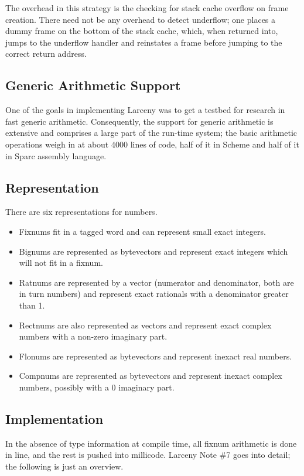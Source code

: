 The overhead in this strategy is the checking for stack cache overflow
on frame creation. There need not be any overhead to detect underflow;
one places a dummy frame on the bottom of the stack cache, which, when
returned into, jumps to the underflow handler and reinstates a frame
before jumping to the correct return address.

\subsection{Generic Arithmetic Support}

One of the goals in implementing Larceny was to get a testbed for research
in fast generic arithmetic. Consequently, the support for generic arithmetic
is extensive and comprises a large part of the run-time system; the basic
arithmetic operations weigh in at about 4000 lines of code, half of it in
Scheme and half of it in Sparc assembly language.

\subsection{Representation}

There are six representations for numbers.

\begin{itemize} 
\item Fixnums fit in a tagged word and
can represent small exact integers.
\item Bignums are represented as bytevectors
and represent exact integers which will not fit in a fixnum.
\item Ratnums
are represented by a vector (numerator and denominator, both are in turn
numbers) and represent exact rationals with a denominator greater than 1.
\item Rectnums are also represented as vectors and represent exact complex 
numbers
with a non-zero imaginary part. 
\item Flonums are represented as bytevectors
and represent inexact real numbers.
\item  Compnums are represented as bytevectors
and represent inexact complex numbers, possibly with a 0 imaginary part.
\end{itemize}

\subsection{Implementation}

In the absence of type information at compile time, all fixnum arithmetic is
done in line, and the rest is pushed into millicode.  Larceny Note \#7 goes
into detail; the following is just an overview.

